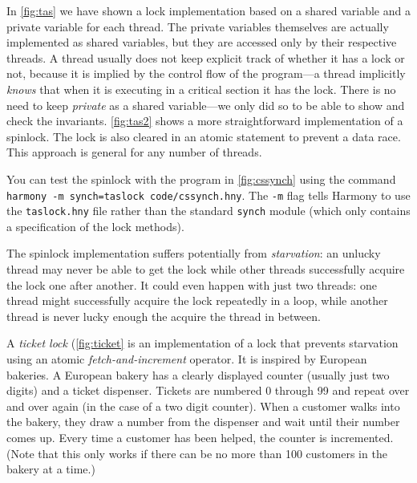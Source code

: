 \documentclass{report}
\begin{document}
In \autoref{fig:tas} we have shown a lock implementation based on a shared
variable and a private variable for each thread.   The private
variables themselves are actually implemented as shared variables,
but they are accessed only by their respective threads.
A thread usually does not keep explicit track of whether it has a lock
or not, because it is implied by the control flow of the program---a
thread implicitly \emph{knows} that when it is executing in a critical
section it has the lock.
There is no need to keep \textit{private} as a shared
variable---we only did so to be able to show and check the invariants.
\autoref{fig:tas2} shows a more straightforward implementation of a spinlock.
The lock is also cleared in an atomic statement to prevent a data race.
This approach is general for any number of threads.

You can test the spinlock with the program in \autoref{fig:cssynch}
using the command \texttt{harmony -m synch=taslock code/cssynch.hny}.
The \texttt{-m} flag tells Harmony to use the \texttt{taslock.hny} file
rather than the standard \texttt{synch} module (which only contains
a specification of the lock methods).

%
The spinlock implementation suffers potentially from \emph{starvation}:
an unlucky thread may never be able to get the lock while other threads
successfully acquire the lock one after another.  It could even happen
with just two threads: one thread might successfully acquire the lock
repeatedly in a loop, while another thread is never lucky enough the
acquire the thread in between.

A \emph{ticket lock} (\autoref{fig:ticket} is an implementation of a
lock that prevents starvation using an atomic \emph{fetch-and-increment}
operator.  It is inspired by European bakeries.  A European bakery has a
clearly displayed counter (usually just two digits) and a ticket dispenser.
Tickets are numbered 0 through 99 and repeat over and over again
(in the case of a two digit counter).
When a customer walks into the bakery, they draw a number from the dispenser
and wait until their number comes up.
Every time a customer has been helped, the counter is incremented.
(Note that this only works if there can be no more than 100 customers in
the bakery at a time.)
\end{document}
